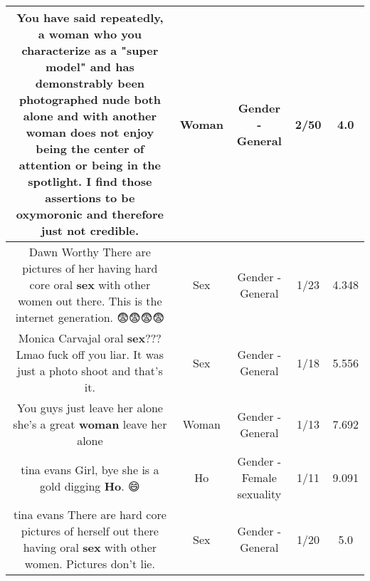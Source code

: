 \documentclass[11pt]{article}
\newlength\mylength
\begin{document}
\begin{center}
\begin{longtable}{|C{.65\mylength}|C{.30\mylength}|C{.12\mylength}|C{.12\mylength}|C{.12\mylength}|}
  \small You have said repeatedly, a \textbf{woman} who you characterize as a "super model" and has demonstrably been photographed nude both alone and with another \textbf{woman} does not enjoy being the center of attention or being in the spotlight. I find those assertions to be oxymoronic and therefore just not credible.\normalsize   & Woman & Gender - General & 2/50 & 4.0 \\  \hline
  \small Dawn Worthy There are pictures of her having hard core oral \textbf{sex} with other women out there. This is the internet generation. 😨😨😨😨\normalsize   & Sex & Gender - General & 1/23 & 4.348 \\  \hline
  \small Monica Carvajal oral \textbf{sex}??? Lmao fuck off you liar. It was just a photo shoot and that's it.\normalsize   & Sex & Gender - General & 1/18 & 5.556 \\  \hline
  \small You guys just leave her alone she's a great \textbf{woman} leave her alone\normalsize   & Woman & Gender - General & 1/13 & 7.692 \\  \hline
  \small tina evans Girl, bye she is a gold digging \textbf{Ho}. 😄\normalsize   & Ho & Gender - Female sexuality & 1/11 & 9.091 \\  \hline
  \small tina evans There are hard core pictures of herself out there having oral \textbf{sex} with other women. Pictures don't lie.\normalsize   & Sex & Gender - General & 1/20 & 5.0 \\  \hline

\end{longtable}
\end{center}
\end{document}
